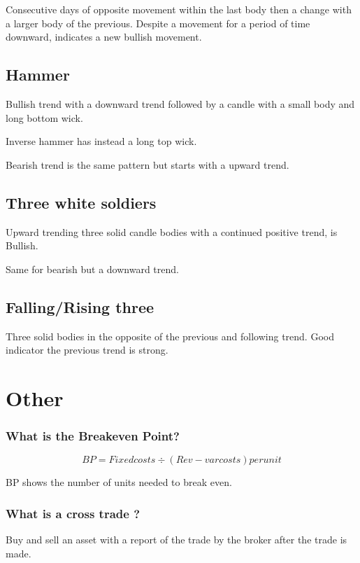\documentclass[11pt]{scrartcl} %
\begin{document}
Consecutive days of opposite movement within the last body then a change with a larger body of the 
previous. Despite a movement for a period of time downward, indicates a new bullish movement.

\subsection{Hammer}

Bullish trend with a downward trend followed by a candle with a small body and long bottom wick.

Inverse hammer has instead a long top wick.

Bearish trend is the same pattern but starts with a upward trend.

\subsection{Three white soldiers}

Upward trending three solid candle bodies with a continued positive trend, is Bullish.

Same for bearish but a downward trend.

\subsection{Falling/Rising three}

Three solid bodies in the opposite of the previous and following trend. Good indicator the previous
trend is strong.

\section{Other}

\subsubsection{What is the Breakeven Point?}

\[ BP = Fixed costs \div (Rev - var costs) per unit \]

BP shows the number of units needed to break even.

\subsubsection{What is a cross trade ?}

Buy and sell an asset with a report of the trade by the broker after the trade is made. \\
\end{document}
